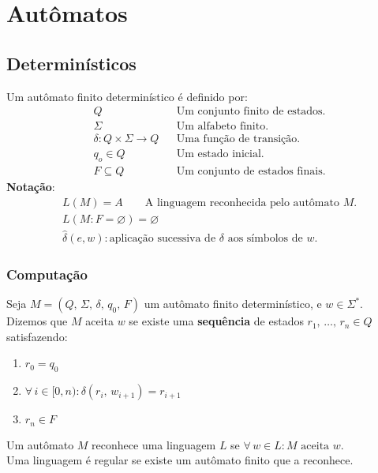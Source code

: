 \documentclass[11pt]{article}
\begin{document}
\section{Autômatos}
\label{sec:org3399f74}
\subsection{Determinísticos}
\label{sec:orga7f8d9b}
Um autômato finito determinístico é definido por:
\begin{align*}
  & Q && \text{Um conjunto finito de estados.} \\
  & \Sigma && \text{Um alfabeto finito.} \\
  & \delta: Q \times \Sigma \to Q && \text{Uma função de transição.} \\
  & q_o \in Q && \text{Um estado inicial.} \\
  & F \subseteq Q && \text{Um conjunto de estados finais.}
\end{align*}
\textbf{Notação}:
\begin{align*}
  & L(M) = A \qquad \text{A linguagem reconhecida pelo autômato $M$.} \\[5pt]
  & L(M: F = \varnothing) = \varnothing \\[5pt]
  & \hat{\delta}(e, w): \text{aplicação sucessiva de }\delta\text{ aos símbolos de }w.
\end{align*}
\subsubsection{Computação}
\label{sec:orgf5573af}
Seja \(M = (Q,\, \Sigma,\, \delta,\, q_0,\, F)\) um autômato finito determinístico, e \(w
    \in \Sigma^*\). \\
Dizemos que \(M\) aceita \(w\) se existe uma \textbf{sequência} de estados
\(r_1, \,\hdots,\, r_n \in Q\) satisfazendo:
\begin{enumerate}
\item \(r_0 = q_0\)
\item \(\forall\, i \in [0, n): \delta(r_i,\, w_{i + 1}) = r_{i + 1}\)
\item \(r_n \in F\)
\end{enumerate}
Um autômato \(M\) reconhece uma linguagem \(L\) se \(\forall\, w \in L: M \text{ aceita } w\). \\
Uma linguagem é regular se existe um autômato finito que a reconhece.
\end{document}
